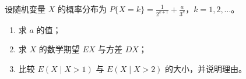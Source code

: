 \documentclass[zihao=5,fontset=windows,oneside]{exam-zh}
\newcommand{\WorkSpace}{\ifdefined\QuestionCrops\else\vfill\fi}
\begin{document}
\begin{question}[index=22,points=12]
设随机变量 $X$ 的概率分布为 $\displaystyle P\{X=k\}=\frac{1}{2^{k+1}}+\frac{a}{3^k}$，$k=1,2,\dots$。
\begin{enumerate}[label=（\arabic*）,leftmargin=2.5em,labelsep=.4em,itemsep=3pt,topsep=3pt]
\item 求 $a$ 的值；
\item 求 $X$ 的数学期望 $EX$ 与方差 $DX$；
\item 比较 $E(X\mid X>1)$ 与 $E(X\mid X>2)$ 的大小，并说明理由。
\end{enumerate}
\end{question}
\WorkSpace
\end{document}
